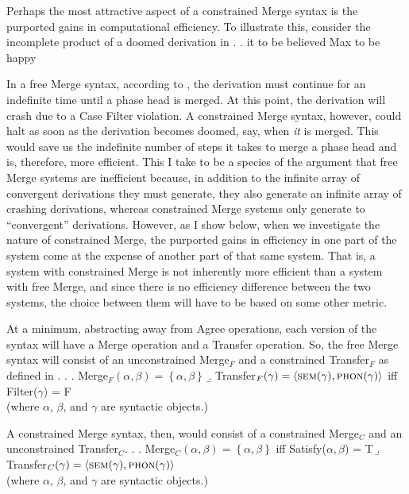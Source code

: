 \documentclass[MilwayThesis]{subfiles}
\begin{document}
Perhaps the most attractive aspect of a constrained Merge syntax is the purported gains in computational efficiency.
To illustrate this, \textcite{frampton2008crash} consider the incomplete product of a doomed derivation in \Next.
\ex. it to be believed Max to be happy

In a free Merge syntax, according to \textcite{frampton2008crash}, the derivation must continue for an indefinite time until a phase head is merged.
At this point, the derivation will crash due to a Case Filter violation.
A constrained Merge syntax, however, could halt as soon as the derivation becomes doomed, say, when \textit{it} is merged.
This would save us the indefinite number of steps it takes to merge a phase head and is, therefore, more efficient.
This I take to be a species of the argument that free Merge systems are inefficient because, in addition to the infinite array of convergent derivations they must generate, they also generate an infinite array of crashing derivations, whereas constrained Merge systems only generate to ``convergent'' derivations.
However, as I show below, when we investigate the nature of constrained Merge, the purported gains in efficiency in one part of the system come at the expense of another part of that same system.
That is, a system with constrained Merge is not inherently more efficient than a system with free Merge, and since there is no efficiency difference between the two systems, the choice between them will have to be based on some other metric.

At a minimum, abstracting away from Agree operations, each version of the syntax will have a Merge operation and a Transfer operation.
So, the free Merge syntax will consist of an unconstrained Merge$_F$ and a constrained Transfer$_F$ as defined in \Next.
\ex.
\a. Merge$_F(\alpha,\beta) = \left\{ \alpha, \beta \right\}$ 
\b. Transfer$_F(\gamma) = \langle\textsc{sem}(\gamma), \textsc{phon}(\gamma)\rangle$ iff Filter($\gamma$) = F\\
(where $\alpha$, $\beta$, and $\gamma$ are syntactic objects.)

A constrained Merge syntax, then, would consist of a constrained Merge$_C$ and an unconstrained Transfer$_C$.
\ex.
\a. Merge$_C(\alpha,\beta) =\left\{\alpha,\beta\right\}$ iff Satisfy($\alpha,\beta$) = T
\b. Transfer$_C(\gamma) = \langle\textsc{sem}(\gamma), \textsc{phon}(\gamma)\rangle$\\
(where $\alpha$, $\beta$, and $\gamma$ are syntactic objects.)
\end{document}
